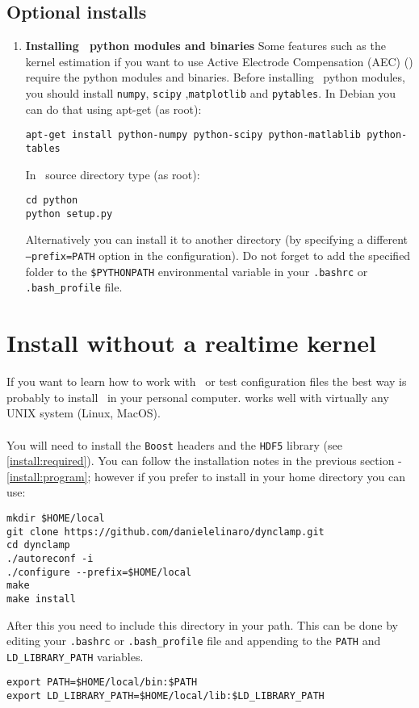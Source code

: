 \subsection{Optional installs} 
\label{install:optional}
\begin{enumerate}
\item \textbf{Installing \progname\ python modules and binaries}
Some features such as the kernel estimation if you want to use Active Electrode Compensation (AEC) (\cite{Brette:2008}) require the python modules and binaries.
Before installing \progname\ python modules, you should install \texttt{numpy}, \texttt{scipy} ,\texttt{matplotlib} and \texttt{pytables}. In Debian you can do that using apt-get (as root): 
\begin{lstlisting}
apt-get install python-numpy python-scipy python-matlablib python-tables
\end{lstlisting}

In \progname\ source directory type (as root):
\begin{lstlisting}
cd python
python setup.py
\end{lstlisting}
Alternatively you can install it to another directory (by specifying a different \texttt{--prefix=PATH} option in the configuration). Do not forget to add the specified folder to the \texttt{\$PYTHONPATH} environmental variable in your \texttt{.bashrc} or \texttt{.bash\_profile} file.

\end{enumerate}

\section{Install without a realtime kernel}
\label{install:nokernel}
If you want to learn how to work with \progname\ or test configuration files the best way is probably to install \progname\ in your personal computer. \textbf{\progname} works well with virtually any UNIX system (Linux, MacOS). 
\paragraph{}
You will need to install the \texttt{Boost} headers and the \texttt{HDF5} library (see \ref{install:required}). 
You can follow the installation notes in the previous section - \ref{install:program}; however if you prefer to install in your home directory you can use:
\begin{lstlisting}
mkdir $HOME/local
git clone https://github.com/danielelinaro/dynclamp.git
cd dynclamp
./autoreconf -i
./configure --prefix=$HOME/local
make
make install
\end{lstlisting}
After this you need to include this directory in your path. This can be done by editing your \texttt{.bashrc} or \texttt{.bash\_profile} file and appending to the \texttt{PATH} and \texttt{LD\_LIBRARY\_PATH} variables.
\begin{lstlisting}
export PATH=$HOME/local/bin:$PATH
export LD_LIBRARY_PATH=$HOME/local/lib:$LD_LIBRARY_PATH
\end{lstlisting}


